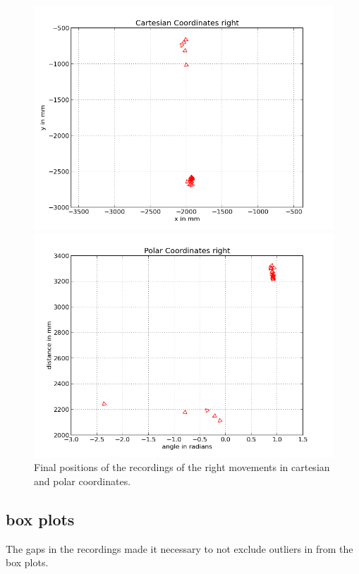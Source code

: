 \documentclass{scrartcl}
\begin{document}
\begin{figure}[H]
\centering
\begin{minipage}{.5\textwidth}
  \centering
  \includegraphics[width=.8\linewidth]{img/right_f.png}
\end{minipage}%
\begin{minipage}{.5\textwidth}
  \centering
  \includegraphics[width=.8\linewidth]{img/right_pc_f.png}
\end{minipage}
\caption{Final positions of the recordings of the right movements in cartesian and polar coordinates.}
\label{fig:right}
\end{figure}


\subsection{box plots}
The gaps in the recordings made it necessary to not exclude outliers in from the box plots.
\end{document}
